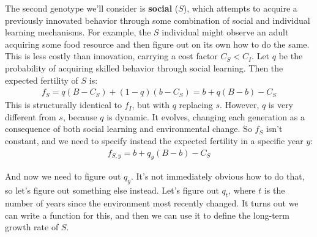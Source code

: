 \documentclass[10pt,reqno]{amsbook}
\newcommand{\bemph}[1]{{\textbf{\textcolor{bemphcol}{#1}}}}
\numberwithin{equation}{chapter}
\begin{document}
The second genotype we'll consider is \bemph{social} ($S$), which attempts to acquire a previously innovated behavior through some combination of social and individual learning mechanisms. For example, the $S$ individual might observe an adult acquiring some food resource and then figure out on its own how to do the same. This is less costly than innovation, carrying a cost factor $C_S < C_I$. Let $q$ be the probability of acquiring skilled behavior through social learning. Then the expected fertility of $S$ is:
\begin{align*}
	f_S = q(B-C_S) + (1-q)(b-C_S) =  b + q( B - b ) - C_S
\end{align*}
This is structurally identical to $f_I$, but with $q$ replacing $s$. However, $q$ is very different from $s$, because $q$ is dynamic. It evolves, changing each generation as a consequence of both social learning and environmental change. So $f_S$ isn't constant, and we need to specify instead the expected fertility in a specific year $y$:
\begin{align*}
	f_{S,y} = b + q_y( B - b ) - C_S
\end{align*}

And now we need to figure out $q_y$. It's not immediately obvious how to do that, so let's figure out something else instead. Let's figure out $q_t$, where $t$ is the number of years since the environment most recently changed. It turns out we can write a function for this, and then we can use it to define the long-term growth rate of $S$. 
\end{document}
